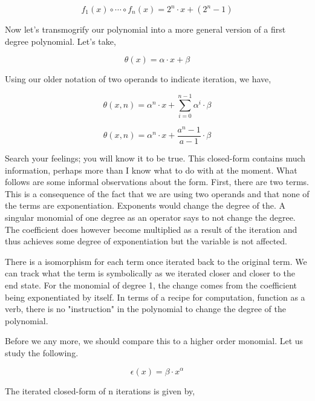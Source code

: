 \documentclass[12pt]{article}
\begin{document}
\begin{equation}
    f_1(x) \circ \cdots \circ f_n(x) =  2^n \cdot x + (2^n - 1)
\end{equation}

Now let's transmogrify our polynomial into a more general version of a first
degree polynomial. Let's take,

\begin{equation}
    \theta(x) = \alpha \cdot x + \beta
\end{equation}

Using our older notation of two operands to indicate iteration, we have,

\begin{equation}
    \theta(x,n) = \alpha^n \cdot x + \sum_{i=0}^{n-1} \alpha^i \cdot \beta
\end{equation}

\begin{equation}
    \theta(x,n) = \alpha^n \cdot x + \frac{a^n-1}{a-1} \cdot \beta
\end{equation}

Search your feelings; you will know it to be true. This closed-form contains
much information, perhaps more than I know what to do with at the moment. What
follows are some informal observations about the form. First, there are two
terms. This is a consequence of the fact that we are using two operands and
that none of the terms are exponentiation. Exponents would change the degree of
the. A singular monomial of one degree as an operator says to not change the
degree. The coefficient does however become multiplied as a result of the
iteration and thus achieves some degree of exponentiation but the variable is
not affected.

There is a isomorphism for each term once iterated back to the original term.
We can track what the term is symbolically as we iterated closer and closer to
the end state. For the monomial of degree 1, the change comes from the
coefficient being exponentiated by itself. In terms of a recipe for
computation, function as a verb, there is no "instruction" in the polynomial to
change the degree of the polynomial.

Before we any more, we should compare this to a higher order monomial. Let us
study the following.

\begin{equation}
    \epsilon(x) = \beta \cdot x^\alpha
\end{equation}

The iterated closed-form of n iterations is given by,
\end{document}
